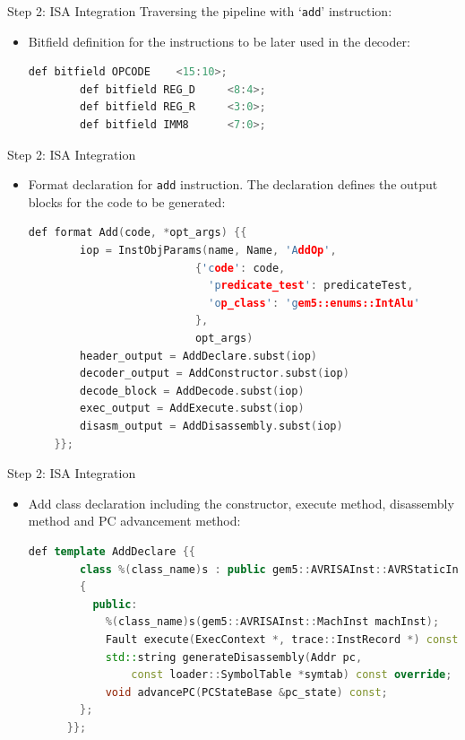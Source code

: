 \begin{frame}[fragile]{Step 2: ISA Integration}
    Traversing the pipeline with `\texttt{add}' instruction:
    \begin{itemize}
      \item Bitfield definition for the instructions to be later used in the decoder: 
      \begin{lstlisting}[language=C++]
        def bitfield OPCODE    <15:10>;
        def bitfield REG_D     <8:4>;
        def bitfield REG_R     <3:0>;
        def bitfield IMM8      <7:0>;
      \end{lstlisting}
    \end{itemize}
\end{frame}

\begin{frame}[fragile]{Step 2: ISA Integration}
  \begin{itemize}
    \item Format declaration for \texttt{add} instruction. The declaration defines the output blocks for the code to be generated:
    \begin{lstlisting}[language=C++]
      def format Add(code, *opt_args) {{
        iop = InstObjParams(name, Name, 'AddOp',
                          {'code': code,
                            'predicate_test': predicateTest,
                            'op_class': 'gem5::enums::IntAlu'
                          },
                          opt_args)
        header_output = AddDeclare.subst(iop)
        decoder_output = AddConstructor.subst(iop)
        decode_block = AddDecode.subst(iop)
        exec_output = AddExecute.subst(iop)
        disasm_output = AddDisassembly.subst(iop)
    }};
    \end{lstlisting}
  \end{itemize}
\end{frame}

\begin{frame}[fragile]{Step 2: ISA Integration}
  \begin{itemize}
    \item Add class declaration including the constructor, execute method, disassembly method and PC advancement method:
    \begin{lstlisting}[language=C++]
      def template AddDeclare {{
        class %(class_name)s : public gem5::AVRISAInst::AVRStaticInst
        {
          public:
            %(class_name)s(gem5::AVRISAInst::MachInst machInst);
            Fault execute(ExecContext *, trace::InstRecord *) const override;
            std::string generateDisassembly(Addr pc,
                const loader::SymbolTable *symtab) const override;
            void advancePC(PCStateBase &pc_state) const;
        };
      }};
    \end{lstlisting}
  \end{itemize}
\end{frame}

